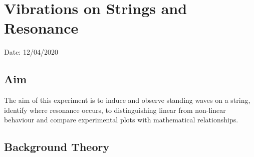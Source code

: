 \chapter{Vibrations on Strings and Resonance}

Date: 12/04/2020

\section{Aim}

The aim of this experiment is to induce and observe standing waves on a string, identify where resonance occurs, to distinguishing linear from non-linear behaviour and compare experimental plots with mathematical relationships.

\section{Background Theory}

